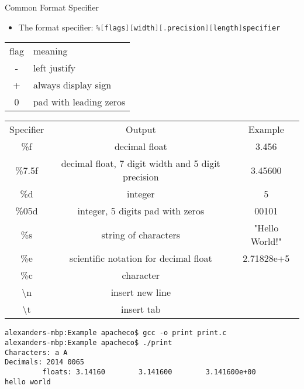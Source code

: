 \documentclass[10pt,t]{beamer}
\begin{document}
\begin{frame}[fragile]{Common Format Specifier}
  \begin{itemize}
    \item The format specifier: \lstinline[language=C,basicstyle=\footnotesize\ttfamily]|%[flags][width][.precision][length]specifier| 
  \end{itemize}
  \begin{center}
    \begin{tabular}{cl}
      \rowcolor{lublue}flag & meaning \\
      \rowcolor{lulime}- & left justify \\
      \rowcolor{lulime}+ & always display sign\\
      \rowcolor{lulime}0 & pad with leading zeros\\
    \end{tabular}
  \end{center}
  \begin{center}
    \begin{tabular}{ccc}
      \rowcolor{lublue}Specifier & Output & Example\\
      \rowcolor{lulime}\%f & decimal float & 3.456 \\
      \rowcolor{lulime!80}\%7.5f & decimal float, 7 digit width and 5 digit precision & 3.45600 \\
      \rowcolor{lulime}\%d & integer & 5\\
      \rowcolor{lulime!70}\%05d & integer, 5 digits pad with zeros & 00101 \\
      \rowcolor{lulime}\%s & string of characters & "Hello World!"\\
      \rowcolor{lulime!60}\%e & scientific notation for decimal float & 2.71828e+5  \\
      \rowcolor{lulime}\%c & character &  \\
      \rowcolor{lulime!50}\textbackslash{}n & insert new line & \\
      \rowcolor{lulime}\textbackslash{}t & insert tab & \\
    \end{tabular}
  \end{center}
\end{frame}

\begin{frame}[fragile]{}
  
  \begin{lstlisting}[style=LINUX]
alexanders-mbp:Example apacheco$ gcc -o print print.c
alexanders-mbp:Example apacheco$ ./print
Characters: a A 
Decimals: 2014 0065
         floats: 3.14160        3.141600        3.141600e+00 
hello world 

  \end{lstlisting}
\end{frame}
\end{document}
